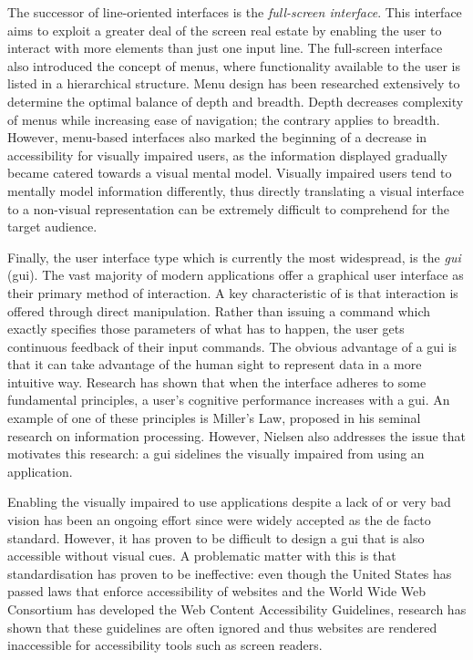The successor of line-oriented interfaces is the \textit{full-screen interface}. This interface aims to exploit a greater deal of the screen real estate by enabling the user to interact with more elements than just one input line. The full-screen interface also introduced the concept of menus, where functionality available to the user is listed in a hierarchical structure. Menu design has been researched extensively to determine the optimal balance of depth and breadth\cite{paap1986optimal, landauer1985selection, fisher1990optimal}. Depth decreases complexity of menus while increasing ease of navigation; the contrary applies to breadth. However, menu-based interfaces also marked the beginning of a decrease in accessibility for visually impaired users, as the information displayed gradually became catered towards a visual mental model. Visually impaired users tend to mentally model information differently, thus directly translating a visual interface to a non-visual representation can be extremely difficult to comprehend for the target audience\cite{edwards1994providing}.

Finally, the user interface type which is currently the most widespread, is the \textit{\acrlong{gui}} (\acrshort{gui}). The vast majority of modern applications offer a graphical user interface as their primary method of interaction. A key characteristic of  is that interaction is offered through direct manipulation. Rather than issuing a command which exactly specifies those parameters of what has to happen, the user gets continuous feedback of their input commands. The obvious advantage of a \acrshort{gui} is that it can take advantage of the human sight to represent data in a more intuitive way. Research has shown that when the interface adheres to some fundamental principles, a user's cognitive performance increases with a \acrshort{gui}. An example of one of these principles is Miller's Law, proposed in his seminal research on information processing\cite{miller1956magical}. However, Nielsen also addresses the issue that motivates this research: a \acrshort{gui} sidelines the visually impaired from using an application.

Enabling the visually impaired to use applications despite a lack of or very bad vision has been an ongoing effort since  were widely accepted as the de facto standard\cite{boyd1990graphical}. However, it has proven to be difficult to design a \acrshort{gui} that is also accessible without visual cues. A problematic matter with this is that standardisation has proven to be ineffective: even though the United States has passed laws that enforce accessibility of websites\cite{Secti81:online} and the World Wide Web Consortium has developed the Web Content Accessibility Guidelines\cite{WebCo83:online}, research has shown that these guidelines are  often ignored and thus websites are rendered inaccessible for accessibility tools such as screen readers\cite{leuthold2008beyond}.

